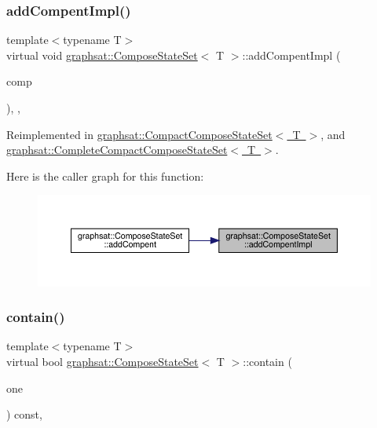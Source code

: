 \subsubsection{\texorpdfstring{addCompentImpl()}{addCompentImpl()}}
{\footnotesize\ttfamily template$<$typename T$>$ \\
virtual void \mbox{\hyperlink{classgraphsat_1_1_compose_state_set}{graphsat\+::\+Compose\+State\+Set}}$<$ T $>$\+::add\+Compent\+Impl (\begin{DoxyParamCaption}\item[{\mbox{\hyperlink{classgraphsat_1_1_single_state_set}{Single\+State\+Set}}$<$ T $>$ \&}]{comp }\end{DoxyParamCaption})\hspace{0.3cm}{\ttfamily [inline]}, {\ttfamily [protected]}, {\ttfamily [virtual]}}



Reimplemented in \mbox{\hyperlink{classgraphsat_1_1_compact_compose_state_set_a11bd85b646593e15141f597abbe301da}{graphsat\+::\+Compact\+Compose\+State\+Set$<$ T $>$}}, and \mbox{\hyperlink{classgraphsat_1_1_complete_compact_compose_state_set_af45ca7e6d6b308d8bdb6f91e0d7830c0}{graphsat\+::\+Complete\+Compact\+Compose\+State\+Set$<$ T $>$}}.

Here is the caller graph for this function\+:\nopagebreak
\begin{figure}[H]
\begin{center}
\leavevmode
\includegraphics[width=350pt]{classgraphsat_1_1_compose_state_set_a143dc652308b16919867155d59fa0a09_icgraph}
\end{center}
\end{figure}
\mbox{\label{classgraphsat_1_1_compose_state_set_abfd0e46ca8319f69a506b7854850782b}} 
\subsubsection{\texorpdfstring{contain()}{contain()}}
{\footnotesize\ttfamily template$<$typename T$>$ \\
virtual bool \mbox{\hyperlink{classgraphsat_1_1_compose_state_set}{graphsat\+::\+Compose\+State\+Set}}$<$ T $>$\+::contain (\begin{DoxyParamCaption}\item[{const vector$<$ pair$<$ int, T $\ast$ $>$$>$ \&}]{one }\end{DoxyParamCaption}) const\hspace{0.3cm}{\ttfamily [inline]}, {\ttfamily [virtual]}}



